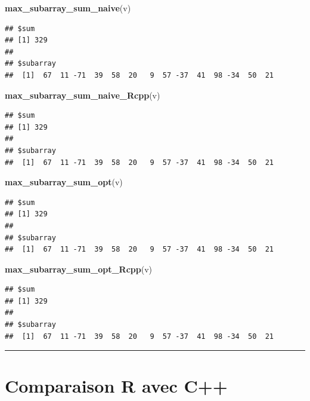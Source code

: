 \documentclass[
]{article}
\newenvironment{Shaded}{\begin{snugshade}}{\end{snugshade}}
\newcommand{\FunctionTok}[1]{\textcolor[rgb]{0.13,0.29,0.53}{\textbf{#1}}}
\newcommand{\NormalTok}[1]{#1}
\begin{document}
\begin{Shaded}
\begin{Highlighting}[]
\FunctionTok{max\_subarray\_sum\_naive}\NormalTok{(v)}
\end{Highlighting}
\end{Shaded}

\begin{verbatim}
## $sum
## [1] 329
## 
## $subarray
##  [1]  67  11 -71  39  58  20   9  57 -37  41  98 -34  50  21
\end{verbatim}

\begin{Shaded}
\begin{Highlighting}[]
\FunctionTok{max\_subarray\_sum\_naive\_Rcpp}\NormalTok{(v)}
\end{Highlighting}
\end{Shaded}

\begin{verbatim}
## $sum
## [1] 329
## 
## $subarray
##  [1]  67  11 -71  39  58  20   9  57 -37  41  98 -34  50  21
\end{verbatim}

\begin{Shaded}
\begin{Highlighting}[]
\FunctionTok{max\_subarray\_sum\_opt}\NormalTok{(v)}
\end{Highlighting}
\end{Shaded}

\begin{verbatim}
## $sum
## [1] 329
## 
## $subarray
##  [1]  67  11 -71  39  58  20   9  57 -37  41  98 -34  50  21
\end{verbatim}

\begin{Shaded}
\begin{Highlighting}[]
\FunctionTok{max\_subarray\_sum\_opt\_Rcpp}\NormalTok{(v)}
\end{Highlighting}
\end{Shaded}

\begin{verbatim}
## $sum
## [1] 329
## 
## $subarray
##  [1]  67  11 -71  39  58  20   9  57 -37  41  98 -34  50  21
\end{verbatim}

\begin{center}\rule{0.5\linewidth}{0.5pt}\end{center}

\section{Comparaison R avec C++}\label{comparaison-r-avec-c}
\end{document}
